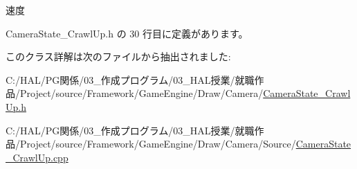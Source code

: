 速度 



 Camera\+State\+\_\+\+Crawl\+Up.\+h の 30 行目に定義があります。



このクラス詳解は次のファイルから抽出されました\+:\begin{DoxyCompactItemize}
\item 
C\+:/\+H\+A\+L/\+P\+G関係/03\+\_\+作成プログラム/03\+\_\+\+H\+A\+L授業/就職作品/\+Project/source/\+Framework/\+Game\+Engine/\+Draw/\+Camera/\mbox{\hyperlink{_camera_state___crawl_up_8h}{Camera\+State\+\_\+\+Crawl\+Up.\+h}}\item 
C\+:/\+H\+A\+L/\+P\+G関係/03\+\_\+作成プログラム/03\+\_\+\+H\+A\+L授業/就職作品/\+Project/source/\+Framework/\+Game\+Engine/\+Draw/\+Camera/\+Source/\mbox{\hyperlink{_camera_state___crawl_up_8cpp}{Camera\+State\+\_\+\+Crawl\+Up.\+cpp}}\end{DoxyCompactItemize}
